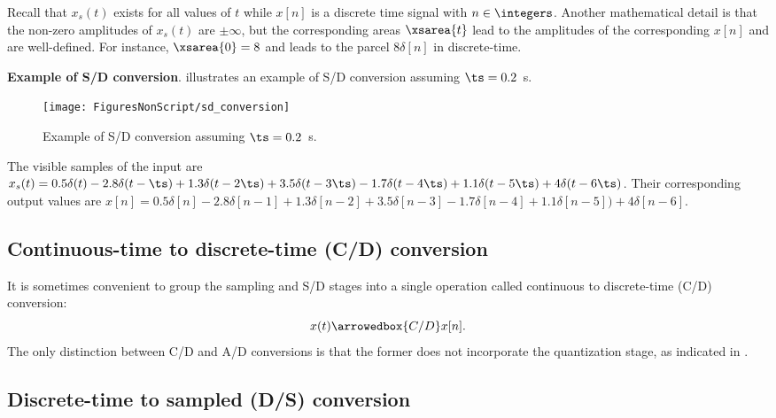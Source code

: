 Recall that $x_s(t)$ exists for all values of $t$ while $x[n]$ is a discrete time signal with $n \in \integers$. 
Another mathematical detail is that the non-zero amplitudes of $x_s(t)$ are $\pm \infty$, but the corresponding areas $\xsarea{t}$ lead to the amplitudes of the corresponding $x[n]$ and are well-defined. For instance, $\xsarea{0}=8$ and leads to the parcel $8\delta[n]$ in discrete-time.

\bExample \textbf{Example of S/D conversion}.
\label{ex:sd_conversion}
 illustrates an example of S/D conversion assuming $\ts=0.2$~s.

\begin{figure}
	\centering
		\texttt{[image: FiguresNonScript/sd\_conversion]}
	\caption{Example of S/D conversion assuming $\ts=0.2$~s.\label{fig:sd_conversion}}
\end{figure}

The visible samples of the input are $x_s(t) = 0.5\delta(t) -2.8\delta(t-\ts) + 1.3\delta(t-2\ts)+ 3.5\delta(t-3\ts) -1.7\delta(t-4\ts) + 1.1\delta(t-5\ts) + 4\delta(t-6\ts)$. Their corresponding output values are $x[n] = 0.5\delta[n] -2.8\delta[n-1] + 1.3\delta[n-2]+ 3.5\delta[n-3] -1.7\delta[n-4] + 1.1\delta[n-5]) + 4\delta[n-6]$.
\eExample 

\subsection{Continuous-time to discrete-time (C/D) conversion}
\label{sec:cd_conversion}

It is sometimes convenient to group the sampling and S/D stages into a single operation called continuous to discrete-time (C/D) conversion:
\[x(t) \arrowedbox{C/D} x[n].\]
The only distinction between C/D and A/D conversions is that the former does not incorporate the quantization stage, as indicated in .


\subsection{Discrete-time to sampled (D/S) conversion}
\label{sec:ds_conversion}

